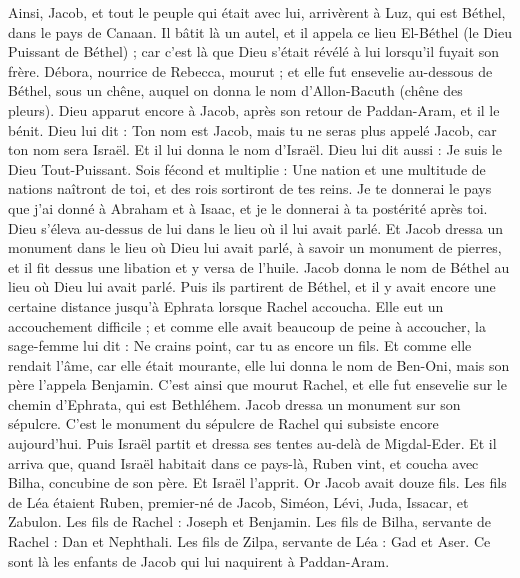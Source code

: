 \begin{multicols}{2}
Ainsi, Jacob, et tout le peuple qui était avec lui, arrivèrent à Luz, qui est Béthel, dans le pays de Canaan.
Il bâtit là un autel, et il appela ce lieu El-Béthel (le Dieu Puissant de Béthel) ; car c'est là que Dieu s'était révélé à lui lorsqu'il fuyait son frère.
Débora, nourrice de Rebecca, mourut ; et elle fut ensevelie au-dessous de Béthel, sous un chêne, auquel on donna le nom d'Allon-Bacuth (chêne des pleurs).
Dieu apparut encore à Jacob, après son retour de Paddan-Aram, et il le bénit.
Dieu lui dit : Ton nom est Jacob, mais tu ne seras plus appelé Jacob, car ton nom sera Israël. Et il lui donna le nom d'Israël.
Dieu lui dit aussi : Je suis le Dieu Tout-Puissant. Sois fécond et multiplie : Une nation et une multitude de nations naîtront de toi, et des rois sortiront de tes reins.
Je te donnerai le pays que j'ai donné à Abraham et à Isaac, et je le donnerai à ta postérité après toi.
Dieu s'éleva au-dessus de lui dans le lieu où il lui avait parlé.
Et Jacob dressa un monument dans le lieu où Dieu lui avait parlé, à savoir un monument de pierres, et il fit dessus une libation et y versa de l'huile.
Jacob donna le nom de Béthel au lieu où Dieu lui avait parlé.
Puis ils partirent de Béthel, et il y avait encore une certaine distance jusqu'à Ephrata lorsque Rachel accoucha. Elle eut un accouchement difficile ;
et comme elle avait beaucoup de peine à accoucher, la sage-femme lui dit : Ne crains point, car tu as encore un fils.
Et comme elle rendait l'âme, car elle était mourante, elle lui donna le nom de Ben-Oni, mais son père l'appela Benjamin.
C'est ainsi que mourut Rachel, et elle fut ensevelie sur le chemin d'Ephrata, qui est Bethléhem.
Jacob dressa un monument sur son sépulcre. C'est le monument du sépulcre de Rachel qui subsiste encore aujourd'hui.
Puis Israël partit et dressa ses tentes au-delà de Migdal-Eder.
Et il arriva que, quand Israël habitait dans ce pays-là, Ruben vint, et coucha avec Bilha, concubine de son père. Et Israël l'apprit. Or Jacob avait douze fils.
Les fils de Léa étaient Ruben, premier-né de Jacob, Siméon, Lévi, Juda, Issacar, et Zabulon.
Les fils de Rachel : Joseph et Benjamin.
Les fils de Bilha, servante de Rachel : Dan et Nephthali.
Les fils de Zilpa, servante de Léa : Gad et Aser. Ce sont là les enfants de Jacob qui lui naquirent à Paddan-Aram.

\end{multicols}
